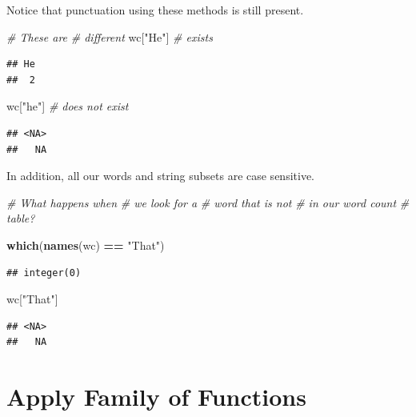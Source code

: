 \documentclass[
]{book}
\newenvironment{Shaded}{\begin{snugshade}}{\end{snugshade}}
\newcommand{\CommentTok}[1]{\textcolor[rgb]{0.56,0.35,0.01}{\textit{#1}}}
\newcommand{\KeywordTok}[1]{\textcolor[rgb]{0.13,0.29,0.53}{\textbf{#1}}}
\newcommand{\NormalTok}[1]{#1}
\newcommand{\OperatorTok}[1]{\textcolor[rgb]{0.81,0.36,0.00}{\textbf{#1}}}
\newcommand{\StringTok}[1]{\textcolor[rgb]{0.31,0.60,0.02}{#1}}
\begin{document}
Notice that punctuation using these methods is still present.

\begin{Shaded}
\begin{Highlighting}[]
\CommentTok{# These are}
\CommentTok{# different}
\NormalTok{wc[}\StringTok{"He"}\NormalTok{]  }\CommentTok{# exists}
\end{Highlighting}
\end{Shaded}

\begin{verbatim}
## He 
##  2
\end{verbatim}

\begin{Shaded}
\begin{Highlighting}[]
\NormalTok{wc[}\StringTok{"he"}\NormalTok{]  }\CommentTok{# does not exist}
\end{Highlighting}
\end{Shaded}

\begin{verbatim}
## <NA> 
##   NA
\end{verbatim}

In addition, all our words and string subsets are case sensitive.

\begin{Shaded}
\begin{Highlighting}[]
\CommentTok{# What happens when}
\CommentTok{# we look for a}
\CommentTok{# word that is not}
\CommentTok{# in our word count}
\CommentTok{# table?}

\KeywordTok{which}\NormalTok{(}\KeywordTok{names}\NormalTok{(wc) }\OperatorTok{==}\StringTok{ "That"}\NormalTok{)}
\end{Highlighting}
\end{Shaded}

\begin{verbatim}
## integer(0)
\end{verbatim}

\begin{Shaded}
\begin{Highlighting}[]
\NormalTok{wc[}\StringTok{"That"}\NormalTok{]}
\end{Highlighting}
\end{Shaded}

\begin{verbatim}
## <NA> 
##   NA
\end{verbatim}

\hypertarget{apply}{%
\chapter{Apply Family of Functions}\label{apply}}
\end{document}
